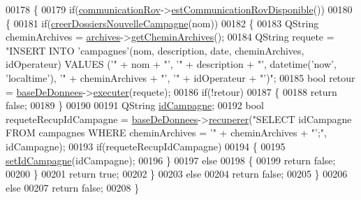 \begin{DoxyCode}
00178 \{
00179     \textcolor{keywordflow}{if}(\hyperlink{class_rov_a8e7aaa17ee2134f26d57241d11ab2a99}{communicationRov}->\hyperlink{class_communication_rov_a513c26b04745fa2ae31b4533d656dfd4}{estCommunicationRovDisponible}())
00180     \{
00181         \textcolor{keywordflow}{if}(\hyperlink{class_rov_a970f36e93f9dbd22734db571b21ceb04}{creerDossiersNouvelleCampagne}(nom))
00182         \{
00183             QString cheminArchives = \hyperlink{class_rov_ad41ed46f169f28da226a979f70c4d8a4}{archives}->\hyperlink{class_archives_a65dfbaba0123e6530b03bfb70e614c90}{getCheminArchives}();
00184             QString requete = \textcolor{stringliteral}{"INSERT INTO 'campagnes'(nom, description, date, cheminArchives, idOperateur)
       VALUES ('"} + nom + \textcolor{stringliteral}{"', '"} + description + \textcolor{stringliteral}{"', datetime('now', 'localtime'), '"} + cheminArchives + \textcolor{stringliteral}{"', '"} + 
      idOperateur + \textcolor{stringliteral}{"')"};
00185             \textcolor{keywordtype}{bool} retour = \hyperlink{class_rov_a5a9a824cd100947c75d0951eb9e1f90c}{baseDeDonnees}->\hyperlink{class_base_de_donnees_aa8de5f8f8bb17edc43f5c0ee33712081}{executer}(requete);
00186             \textcolor{keywordflow}{if}(!retour)
00187             \{
00188                 \textcolor{keywordflow}{return} \textcolor{keyword}{false};
00189             \}
00190 
00191             QString \hyperlink{class_rov_aaaed58cd7ee9edbeab5251cd413a1bae}{idCampagne};
00192             \textcolor{keywordtype}{bool} requeteRecupIdCampagne = \hyperlink{class_rov_a5a9a824cd100947c75d0951eb9e1f90c}{baseDeDonnees}->\hyperlink{class_base_de_donnees_a77539baad389f5acf754cd2cd452403e}{recuperer}(\textcolor{stringliteral}{"SELECT idCampagne
       FROM campagnes WHERE cheminArchives = '"} + cheminArchives + \textcolor{stringliteral}{"';"}, idCampagne);
00193             \textcolor{keywordflow}{if}(requeteRecupIdCampagne)
00194             \{
00195                 \hyperlink{class_rov_a9bbaec4a59dae307440bfeefbc56190b}{setIdCampagne}(idCampagne);
00196             \}
00197             \textcolor{keywordflow}{else}
00198             \{
00199                 \textcolor{keywordflow}{return} \textcolor{keyword}{false};
00200             \}
00201             \textcolor{keywordflow}{return} \textcolor{keyword}{true};
00202         \}
00203         \textcolor{keywordflow}{else}
00204             \textcolor{keywordflow}{return} \textcolor{keyword}{false};
00205     \}
00206     \textcolor{keywordflow}{else}
00207         \textcolor{keywordflow}{return} \textcolor{keyword}{false};
00208 \}
\end{DoxyCode}
\mbox{\label{class_rov_ac24b94eaac569252bdc0b1919489a761}} 
